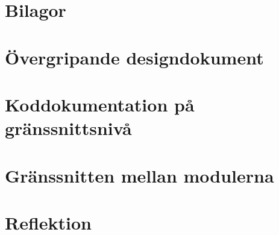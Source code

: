 \documentclass{article}
\begin{document}
\section{Bilagor}
\appendix
\section{Övergripande designdokument}
\label{sec:design}
\section{Koddokumentation på gränssnittsnivå}
\section{Gränssnitten mellan modulerna}
\section{Reflektion}
\end{document}
